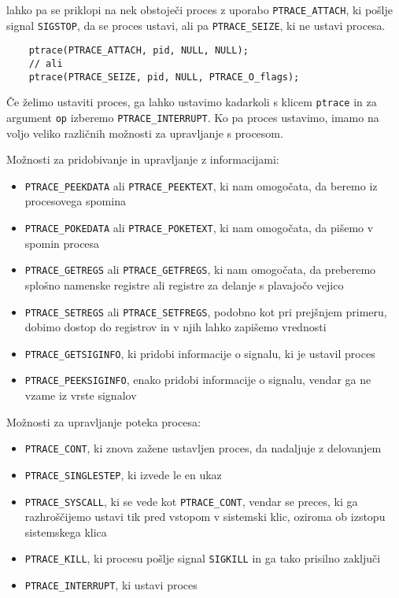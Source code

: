 \documentclass[a4paper,notitlepage]{article}
\newcommand{\code}[1]{\texttt{#1}}
\begin{document}
lahko pa se priklopi na nek obstoječi proces z uporabo \code{PTRACE_ATTACH}, ki pošlje signal \code{SIGSTOP}, da se proces ustavi, ali pa \code{PTRACE_SEIZE}, ki ne ustavi procesa.

\begin{verbatim}
    ptrace(PTRACE_ATTACH, pid, NULL, NULL);
    // ali
    ptrace(PTRACE_SEIZE, pid, NULL, PTRACE_O_flags);
\end{verbatim}

Če želimo ustaviti proces, ga lahko ustavimo kadarkoli s klicem \code{ptrace} in za argument \code{op} izberemo \code{PTRACE_INTERRUPT}.
Ko pa proces ustavimo, imamo na voljo veliko različnih možnosti za upravljanje s procesom.

Možnosti za pridobivanje in upravljanje z informacijami:
\begin{itemize}
    \item \code{PTRACE_PEEKDATA} ali \code{PTRACE_PEEKTEXT}, ki nam omogočata, da beremo iz procesovega spomina
    \item \code{PTRACE_POKEDATA} ali \code{PTRACE_POKETEXT}, ki nam omogočata, da pišemo v spomin procesa
    \item \code{PTRACE_GETREGS} ali \code{PTRACE_GETFREGS}, ki nam omogočata, da preberemo splošno namenske registre ali registre za delanje s plavajočo vejico
    \item \code{PTRACE_SETREGS} ali \code{PTRACE_SETFREGS}, podobno kot pri prejšnjem primeru, dobimo dostop do registrov in v njih lahko zapišemo vrednosti
    \item \code{PTRACE_GETSIGINFO}, ki pridobi informacije o signalu, ki je ustavil proces
    \item \code{PTRACE_PEEKSIGINFO}, enako pridobi informacije o signalu, vendar ga ne vzame iz vrste signalov
\end{itemize}

Možnosti za upravljanje poteka procesa:
\begin{itemize}
    \item \code{PTRACE_CONT}, ki znova zažene ustavljen proces, da nadaljuje z delovanjem
    \item \code{PTRACE_SINGLESTEP}, ki izvede le en ukaz
    \item \code{PTRACE_SYSCALL}, ki se vede kot \code{PTRACE_CONT}, vendar se preces, ki ga razhroščijemo ustavi tik pred vstopom v sistemski klic, oziroma ob izstopu sistemskega klica
    \item \code{PTRACE_KILL}, ki procesu pošlje signal \code{SIGKILL} in ga tako prisilno zaključi
    \item \code{PTRACE_INTERRUPT}, ki ustavi proces
\end{itemize}
\end{document}
